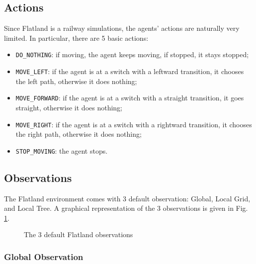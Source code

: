 \documentclass[a4paper, 12pt]{article}
\numberwithin{equation}{section}
\begin{document}
\subsection[Actions]{Actions \cite{actions-rewards}}

Since Flatland is a railway simulations, the agents' actions are naturally very limited. In particular, there are 5 basic actions:
\begin{itemize}
	\item \texttt{DO\_NOTHING}: if moving, the agent keeps moving, if stopped, it stays stopped;
	\item \texttt{MOVE\_LEFT}: if the agent is at a switch with a leftward transition, it chooses the left path, otherwise it does nothing;
	\item \texttt{MOVE\_FORWARD}: if the agent is at a switch with a straight transition, it goes straight, otherwise it does nothing;
	\item \texttt{MOVE\_RIGHT}: if the agent is at a switch with a rightward transition, it chooses the right path, otherwise it does nothing;
	\item \texttt{STOP\_MOVING}: the agent stops.
\end{itemize}


\subsection[Observations]{Observations \cite{observations}}

The Flatland environment comes with 3 default observation: Global, Local Grid, and Local Tree. A graphical representation of the 3 observations is given in Fig. \ref{fig:observations}.

\begin{figure}[h]
	\centering
		\caption{The 3 default Flatland observations}
	\label{fig:observations}
\end{figure}


\subsubsection{Global Observation}
\end{document}
